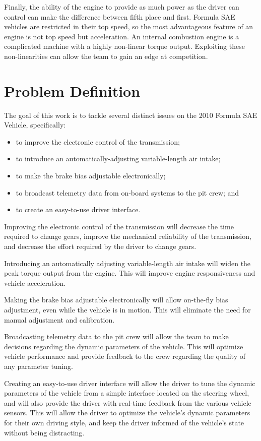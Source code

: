 Finally, the ability of the engine to provide as much power as the driver can control can make the difference between fifth place and first. Formula SAE vehicles are restricted in their top speed, so the most advantageous feature of an engine is not top speed but acceleration. An internal combustion engine is a complicated machine with a highly non-linear torque output. Exploiting these non-linearities can allow the team to gain an edge at competition.

\section{Problem Definition}

The goal of this work is to tackle several distinct issues on the 2010 Formula SAE Vehicle, specifically:

\begin{itemize}
 \item to improve the electronic control of the transmission;
 \item to introduce an automatically-adjusting variable-length air intake;
 \item to make the brake bias adjustable electronically;
 \item to broadcast telemetry data from on-board systems to the pit crew; and
 \item to create an easy-to-use driver interface.
\end{itemize}

Improving the electronic control of the transmission will decrease the time required to change gears, improve the mechanical reliability of the transmission, and decrease the effort required by the driver to change gears. 

Introducing an automatically adjusting variable-length air intake will widen the peak torque output from the engine. This will improve engine responsiveness and vehicle acceleration.
 
Making the brake bias adjustable electronically will allow on-the-fly bias adjustment, even while the vehicle is in motion. This will eliminate the need for manual adjustment and calibration.
 
Broadcasting telemetry data to the pit crew will allow the team to make decisions regarding the dynamic parameters of the vehicle. This will optimize vehicle performance and provide feedback to the crew regarding the quality of any parameter tuning.

Creating an easy-to-use driver interface will allow the driver to tune the dynamic parameters of the vehicle from a simple interface located on the steering wheel, and will also provide the driver with real-time feedback from the various vehicle sensors. This will allow the driver to optimize the vehicle's dynamic parameters for their own driving style, and keep the driver informed of the vehicle's state without being distracting.
 
